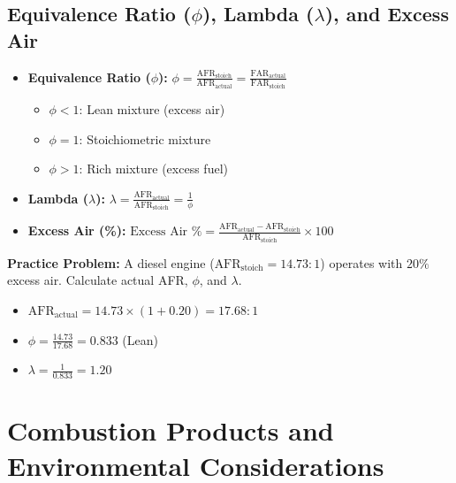 \documentclass[12pt,a4paper]{article}
\begin{document}
\subsection{Equivalence Ratio ($\phi$), Lambda ($\lambda$), and Excess Air}
\begin{itemize}
    \item \textbf{Equivalence Ratio ($\phi$):} $\phi = \frac{\text{AFR}_{\mathrm{stoich}}}{\text{AFR}_{\mathrm{actual}}} = \frac{\text{FAR}_{\mathrm{actual}}}{\text{FAR}_{\mathrm{stoich}}}$
    \begin{itemize}
        \item $\phi < 1$: Lean mixture (excess air)
        \item $\phi = 1$: Stoichiometric mixture
        \item $\phi > 1$: Rich mixture (excess fuel)
    \end{itemize}
    \item \textbf{Lambda ($\lambda$):} $\lambda = \frac{\text{AFR}_{\mathrm{actual}}}{\text{AFR}_{\mathrm{stoich}}} = \frac{1}{\phi}$
    \item \textbf{Excess Air (\%):} $\text{Excess Air \%} = \frac{\text{AFR}_{\mathrm{actual}} - \text{AFR}_{\mathrm{stoich}}}{\text{AFR}_{\mathrm{stoich}}} \times 100$
\end{itemize}

\begin{example}
\textbf{Practice Problem:} A diesel engine ($\text{AFR}_{\mathrm{stoich}} = 14.73:1$) operates with $20\%$ excess air. Calculate actual AFR, $\phi$, and $\lambda$.
\begin{itemize}
    \item $\text{AFR}_{\mathrm{actual}} = 14.73 \times (1 + 0.20) = 17.68 : 1$
    \item $\phi = \frac{14.73}{17.68} = 0.833$ (Lean)
    \item $\lambda = \frac{1}{0.833} = 1.20$
\end{itemize}
\end{example}

\section{Combustion Products and Environmental Considerations}
\end{document}
